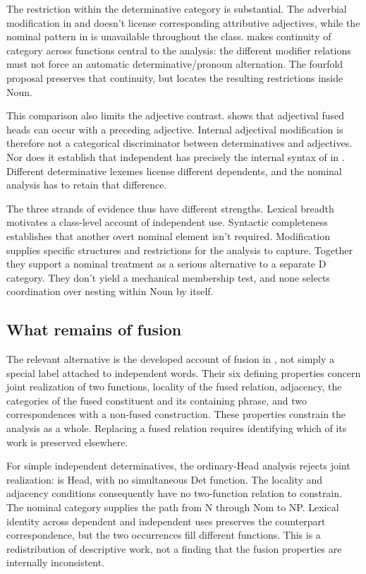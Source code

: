 \documentclass[12pt]{article}
\begin{document}
The restriction within the determinative category is substantial. The adverbial modification in  and  doesn't license corresponding attributive adjectives, while the nominal pattern in  is unavailable throughout the class. \textcite{payne2010} makes continuity of category across functions central to the analysis: the different modifier relations must not force an automatic determinative/pronoun alternation. The fourfold proposal preserves that continuity, but locates the resulting restrictions inside Noun.

This comparison also limits the adjective contrast.  shows that adjectival fused heads can occur with a preceding adjective. Internal adjectival modification is therefore not a categorical discriminator between determinatives and adjectives. Nor does it establish that independent  has precisely the internal syntax of  in . Different determinative lexemes license different dependents, and the nominal analysis has to retain that difference.

The three strands of evidence thus have different strengths. Lexical breadth motivates a class-level account of independent use. Syntactic completeness establishes that another overt nominal element isn't required. Modification supplies specific structures and restrictions for the analysis to capture. Together they support a nominal treatment as a serious alternative to a separate D category. They don't yield a mechanical membership test, and none selects coordination over nesting within Noun by itself.

\subsection{What remains of fusion}

The relevant alternative is the developed account of fusion in \textcite{Payne2007}, not simply a special label attached to independent words. Their six defining properties concern joint realization of two functions, locality of the fused relation, adjacency, the categories of the fused constituent and its containing phrase, and two correspondences with a non-fused construction. These properties constrain the analysis as a whole. Replacing a fused relation requires identifying which of its work is preserved elsewhere.

For simple independent determinatives, the ordinary-Head analysis rejects joint realization:  is Head, with no simultaneous Det function. The locality and adjacency conditions consequently have no two-function relation to constrain. The nominal category supplies the path from N through Nom to NP. Lexical identity across dependent and independent uses preserves the counterpart correspondence, but the two occurrences fill different functions. This is a redistribution of descriptive work, not a finding that the fusion properties are internally inconsistent.
\end{document}
